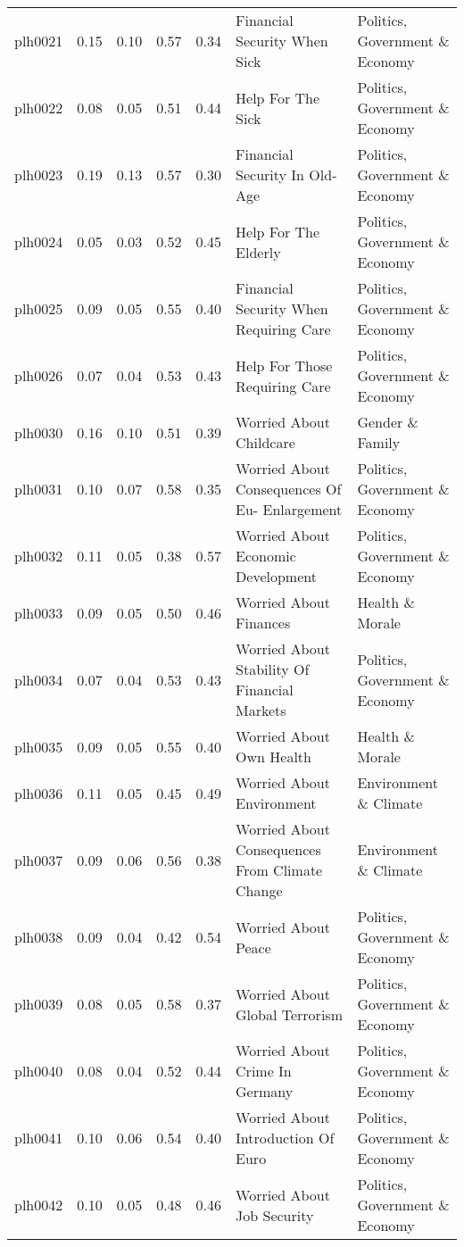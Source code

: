 \documentclass[
  12pt,
]{article}
\begin{document}
\begin{landscape}
\begin{scriptsize}
\begin{longtable}{|p{1.75in}|p{0.3in}|p{0.3in}|p{0.3in}|p{0.3in}|p{2.5in}|p{2.5in}}
plh0021 & 0.15 & 0.10 & 0.57 & 0.34 & Financial Security When Sick & Politics, Government \& Economy \\ 
plh0022 & 0.08 & 0.05 & 0.51 & 0.44 & Help For The Sick & Politics, Government \& Economy \\ 
plh0023 & 0.19 & 0.13 & 0.57 & 0.30 & Financial Security In Old-Age & Politics, Government \& Economy \\ 
plh0024 & 0.05 & 0.03 & 0.52 & 0.45 & Help For The Elderly & Politics, Government \& Economy \\ 
plh0025 & 0.09 & 0.05 & 0.55 & 0.40 & Financial Security When Requiring Care & Politics, Government \& Economy \\ 
plh0026 & 0.07 & 0.04 & 0.53 & 0.43 & Help For Those Requiring Care & Politics, Government \& Economy \\ 
plh0030 & 0.16 & 0.10 & 0.51 & 0.39 & Worried About Childcare & Gender \& Family \\ 
plh0031 & 0.10 & 0.07 & 0.58 & 0.35 & Worried About Consequences Of Eu- Enlargement & Politics, Government \& Economy \\ 
plh0032 & 0.11 & 0.05 & 0.38 & 0.57 & Worried About Economic Development & Politics, Government \& Economy \\ 
plh0033 & 0.09 & 0.05 & 0.50 & 0.46 & Worried About Finances & Health \& Morale \\ 
plh0034 & 0.07 & 0.04 & 0.53 & 0.43 & Worried About Stability Of Financial Markets & Politics, Government \& Economy \\ 
plh0035 & 0.09 & 0.05 & 0.55 & 0.40 & Worried About Own Health & Health \& Morale \\ 
plh0036 & 0.11 & 0.05 & 0.45 & 0.49 & Worried About Environment & Environment \& Climate \\ 
plh0037 & 0.09 & 0.06 & 0.56 & 0.38 & Worried About Consequences From Climate Change & Environment \& Climate \\ 
plh0038 & 0.09 & 0.04 & 0.42 & 0.54 & Worried About Peace & Politics, Government \& Economy \\ 
plh0039 & 0.08 & 0.05 & 0.58 & 0.37 & Worried About Global Terrorism & Politics, Government \& Economy \\ 
plh0040 & 0.08 & 0.04 & 0.52 & 0.44 & Worried About Crime In Germany & Politics, Government \& Economy \\ 
plh0041 & 0.10 & 0.06 & 0.54 & 0.40 & Worried About Introduction Of Euro & Politics, Government \& Economy \\ 
plh0042 & 0.10 & 0.05 & 0.48 & 0.46 & Worried About Job Security & Politics, Government \& Economy \\ 

\end{longtable}
\end{scriptsize}
\end{landscape}
\end{document}
